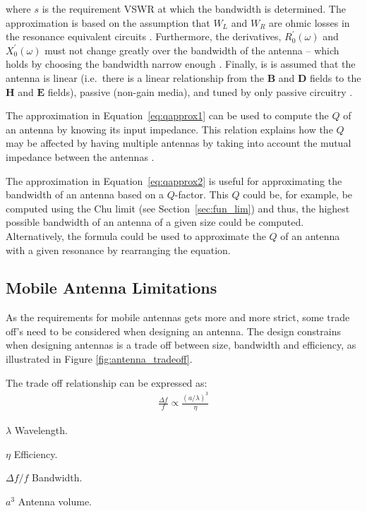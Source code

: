 where $s$ is the requirement VSWR at which the bandwidth is determined. The approximation is based on the assumption that $W_L$ and $W_R$ are ohmic losses in the resonance equivalent circuits \cite{yaghjian2005impedance}. Furthermore, the derivatives, $R^{\prime}_0(\omega)$ and $X^{\prime}_0(\omega)$ must not change greatly over the bandwidth of the antenna -- which holds by choosing the bandwidth narrow enough \cite{yaghjian2005impedance}.
Finally, is is assumed that the antenna is linear (i.e.\ there is a linear relationship from the $\mathbf{B}$ and $\mathbf{D}$ fields to the $\mathbf{H}$ and $\mathbf{E}$ fields), passive (non-gain media), and tuned by only passive circuitry \cite{yaghjian2005impedance}. 

The approximation in Equation~\ref{eq:qapprox1} can be used to compute the $Q$ of an antenna by knowing its input impedance. This relation explains how the $Q$ may be affected by having multiple antennas by taking into account the mutual impedance between the antennas \cite{balanis2012antenna}.

The approximation in Equation~\ref{eq:qapprox2} is useful for approximating the bandwidth of an antenna based on a $Q$-factor. This $Q$ could be, for example, be computed using the Chu limit (see Section~\ref{sec:fun_lim}) and thus, the highest possible bandwidth of an antenna of a given size could be computed. Alternatively, the formula could be used to approximate the $Q$ of an antenna with a given resonance by rearranging the equation.



\subsection{Mobile Antenna Limitations}
\label{subsec:ant_limit}
As the requirements for mobile antennas gets more and more strict, some trade off's need to be considered when designing an antenna.
The design constrains when designing antennas is a trade off between size, bandwidth and efficiency, as illustrated in Figure \ref{fig:antenna_tradeoff}. 

The trade off relationship can be expressed as\cite{hilbert2015tradeoff}: 
\begin{align*}
  \frac{\Delta f}{f} \propto \frac{(a/ \lambda)^3}{\eta}
\end{align*}

\begin{where}
\item [$\lambda$] Wavelength.
\item [$\eta$] Efficiency.
\item [$\Delta f / f$] Bandwidth.
\item [$a^3$] Antenna volume.
\end{where}

